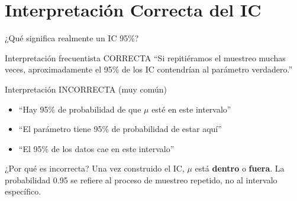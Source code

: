 \documentclass[aspectratio=169,11pt]{beamer}
\begin{document}
\section{Interpretación Correcta del IC}

\begin{frame}{¿Qué significa realmente un IC 95\%?}
\small
\begin{block}{Interpretación frecuentista CORRECTA}
``Si repitiéramos el muestreo muchas veces, aproximadamente el 95\% de los IC contendrían al parámetro verdadero.''
\end{block}

\pause

\begin{alertblock}{Interpretación INCORRECTA (muy común)}
\begin{itemize}\setlength{\itemsep}{0pt}
  \item ``Hay 95\% de probabilidad de que $\mu$ esté en este intervalo'' \textcolor{red}{\xmark}
  \item ``El parámetro tiene 95\% de probabilidad de estar aquí'' \textcolor{red}{\xmark}
  \item ``El 95\% de los datos cae en este intervalo'' \textcolor{red}{\xmark}
\end{itemize}
\end{alertblock}

\pause

\begin{block}{¿Por qué es incorrecta?}
Una vez construido el IC, $\mu$ está \textbf{dentro} o \textbf{fuera}. La probabilidad 0.95 se refiere al proceso de muestreo repetido, no al intervalo específico.
\end{block}
\end{frame}
\end{document}
